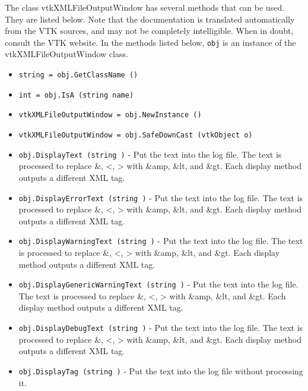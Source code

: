 The class vtkXMLFileOutputWindow has several methods that can be used.
  They are listed below.
Note that the documentation is translated automatically from the VTK sources,
and may not be completely intelligible.  When in doubt, consult the VTK website.
In the methods listed below, \verb|obj| is an instance of the vtkXMLFileOutputWindow class.
\begin{itemize}
\item  \verb|string = obj.GetClassName ()|

\item  \verb|int = obj.IsA (string name)|

\item  \verb|vtkXMLFileOutputWindow = obj.NewInstance ()|

\item  \verb|vtkXMLFileOutputWindow = obj.SafeDownCast (vtkObject o)|

\item  \verb|obj.DisplayText (string )| -  Put the text into the log file. The text is processed to
 replace \&, <, > with \&amp, \&lt, and \&gt.
 Each display method outputs a different XML tag.

\item  \verb|obj.DisplayErrorText (string )| -  Put the text into the log file. The text is processed to
 replace \&, <, > with \&amp, \&lt, and \&gt.
 Each display method outputs a different XML tag.

\item  \verb|obj.DisplayWarningText (string )| -  Put the text into the log file. The text is processed to
 replace \&, <, > with \&amp, \&lt, and \&gt.
 Each display method outputs a different XML tag.

\item  \verb|obj.DisplayGenericWarningText (string )| -  Put the text into the log file. The text is processed to
 replace \&, <, > with \&amp, \&lt, and \&gt.
 Each display method outputs a different XML tag.

\item  \verb|obj.DisplayDebugText (string )| -  Put the text into the log file. The text is processed to
 replace \&, <, > with \&amp, \&lt, and \&gt.
 Each display method outputs a different XML tag.

\item  \verb|obj.DisplayTag (string )| -  Put the text into the log file without processing it.

\end{itemize}
